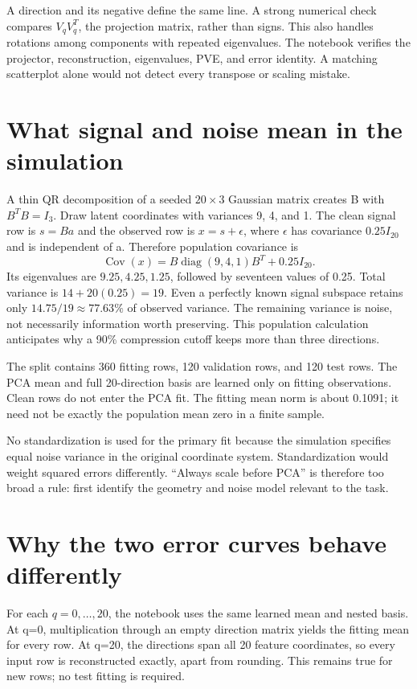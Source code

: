 A direction and its negative define the same line. A strong numerical check compares
$V_qV_q^T$, the projection matrix, rather than signs. This also handles rotations among components with repeated eigenvalues.
The notebook verifies the projector, reconstruction, eigenvalues, PVE, and error identity. A matching scatterplot alone would not detect every transpose or scaling mistake.


\section{What signal and noise mean in the simulation}
A thin QR decomposition of a seeded $20\times3$ Gaussian matrix creates B with $B^TB=I_3$.
Draw latent coordinates with variances 9, 4, and 1. The clean signal row is $s=Ba$ and the observed row is
$x=s+\epsilon$, where $\epsilon$ has covariance $0.25I_{20}$ and is independent of a.
Therefore population covariance is
\[\operatorname{Cov}(x)=B\operatorname{diag}(9,4,1)B^T+0.25I_{20}.\]
Its eigenvalues are $9.25,4.25,1.25$, followed by seventeen values of 0.25.
Total variance is $14+20(0.25)=19$. Even a perfectly known signal subspace retains only
$14.75/19\approx77.63\%$ of observed variance. The remaining variance is noise, not necessarily information worth preserving.
This population calculation anticipates why a 90\% compression cutoff keeps more than three directions.

The split contains 360 fitting rows, 120 validation rows, and 120 test rows. The PCA mean and full 20-direction basis
are learned only on fitting observations. Clean rows do not enter the PCA fit. The fitting mean norm is about 0.1091;
it need not be exactly the population mean zero in a finite sample.

No standardization is used for the primary fit because the simulation specifies equal noise variance in the original coordinate system.
Standardization would weight squared errors differently. ``Always scale before PCA'' is therefore too broad a rule:
first identify the geometry and noise model relevant to the task.

\section{Why the two error curves behave differently}
For each $q=0,\ldots,20$, the notebook uses the same learned mean and nested basis.
At q=0, multiplication through an empty direction matrix yields the fitting mean for every row.
At q=20, the directions span all 20 feature coordinates, so every input row is reconstructed exactly, apart from rounding.
This remains true for new rows; no test fitting is required.

